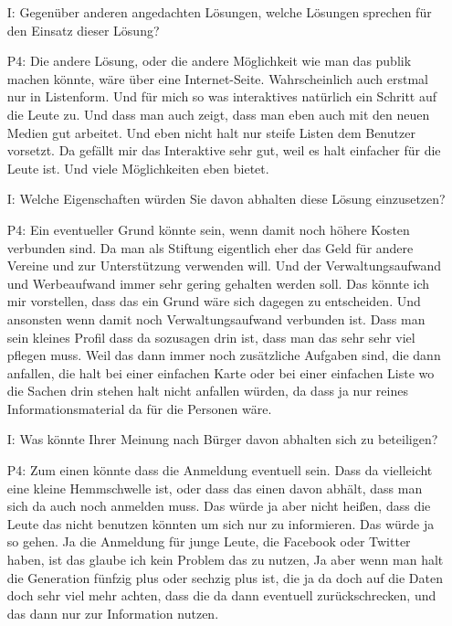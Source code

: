 \begin{itemize}
    \item[I:] Gegen{\"u}ber anderen angedachten L{\"o}sungen, welche L{\"o}sungen sprechen f{\"u}r den Einsatz dieser L{\"o}sung?
    \item[P4:] Die andere L{\"o}sung, oder die andere M{\"o}glichkeit wie man das publik machen k{\"o}nnte, w{\"a}re {\"u}ber eine Internet-Seite. Wahrscheinlich auch erstmal nur in Listenform. Und f{\"u}r mich so was interaktives nat{\"u}rlich ein Schritt auf die Leute zu. Und dass man auch zeigt, dass man eben auch mit den neuen Medien gut arbeitet. Und eben nicht halt nur steife Listen dem Benutzer vorsetzt. Da gef{\"a}llt mir das Interaktive sehr gut, weil es halt einfacher f{\"u}r die Leute ist. Und viele M{\"o}glichkeiten eben bietet.
    \item[I:] Welche Eigenschaften w{\"u}rden Sie davon abhalten diese L{\"o}sung einzusetzen?
    \item[P4:] Ein eventueller Grund k{\"o}nnte sein, wenn damit noch h{\"o}here Kosten verbunden sind. Da man als Stiftung eigentlich eher das Geld f{\"u}r andere Vereine und zur Unterst{\"u}tzung verwenden will. Und der Verwaltungsaufwand und Werbeaufwand immer sehr gering gehalten werden soll. Das k{\"o}nnte ich mir vorstellen, dass das ein Grund w{\"a}re sich dagegen zu entscheiden. Und ansonsten wenn damit noch Verwaltungsaufwand verbunden ist. Dass man sein kleines Profil dass da sozusagen drin ist, dass man das sehr sehr viel pflegen muss. Weil das dann immer noch zus{\"a}tzliche Aufgaben sind, die dann anfallen, die halt bei einer einfachen Karte oder bei einer einfachen Liste wo die Sachen drin stehen halt nicht anfallen w{\"u}rden, da dass ja nur reines Informationsmaterial da f{\"u}r die Personen w{\"a}re.
    \item[I:] Was k{\"o}nnte Ihrer Meinung nach B{\"u}rger davon abhalten sich zu beteiligen?
    \item[P4:] Zum einen k{\"o}nnte dass die Anmeldung eventuell sein. Dass da vielleicht eine kleine Hemmschwelle ist, oder dass das einen davon abh{\"a}lt, dass man sich da auch noch anmelden muss. Das w{\"u}rde ja aber nicht hei{\ss}en, dass die Leute das nicht benutzen k{\"o}nnten um sich nur zu informieren. Das w{\"u}rde ja so gehen. Ja die Anmeldung f{\"u}r junge Leute, die Facebook oder Twitter haben, ist das glaube ich kein Problem das zu nutzen, Ja aber wenn man halt die Generation f{\"u}nfzig plus oder sechzig plus ist, die ja da doch auf die Daten doch sehr viel mehr achten, dass die da dann eventuell zur{\"u}ckschrecken, und das dann nur zur Information nutzen.

\end{itemize}
